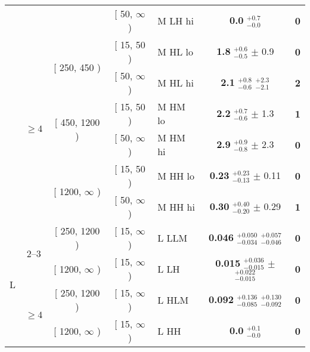 \begin{table}[htbp]
\begin{tabular}{cccclcc}
& & & [ 50, $\infty$ ) & M LH hi & \textbf{0.0} $^{+0.7}_{-0.0}$ & \textbf{0}\\ %

%

& \multirow{6}{*}{$\geq 4$} & \multirow{2}{*}{[ 250, 450 )} & [ 15, 50 ) & M HL lo & \textbf{1.8} $^{+0.6}_{-0.5}$ $\pm$ 0.9 & \textbf{0}\\ %

& & & [ 50, $\infty$ ) & M HL hi & \textbf{2.1} $^{+0.8}_{-0.6}$ $^{+2.3}_{-2.1}$ & \textbf{2}\\ %

& & \multirow{2}{*}{[ 450, 1200 )} & [ 15, 50 ) & M HM lo & \textbf{2.2} $^{+0.7}_{-0.6}$ $\pm$ 1.3 & \textbf{1}\\ %

& & & [ 50, $\infty$ ) & M HM hi & \textbf{2.9} $^{+0.9}_{-0.8}$ $\pm$ 2.3 & \textbf{0}\\ %

& & \multirow{2}{*}{[ 1200, $\infty$ )} & [ 15, 50 ) & M HH lo & \textbf{0.23} $^{+0.23}_{-0.13}$ $\pm$ 0.11 & \textbf{0}\\ %

& & & [ 50, $\infty$ ) & M HH hi & \textbf{0.30} $^{+0.40}_{-0.20}$ $\pm$ 0.29 & \textbf{1}\\ %

\hline

\hline

\multirow{4}{*}{L} 

& \multirow{2}{*}{2--3} & [ 250, 1200 ) & [ 15, $\infty$ ) & L LLM  & \textbf{0.046} $^{+0.050}_{-0.034}$ $^{+0.057}_{-0.046}$ & \textbf{0}\\ %

&  & [ 1200, $\infty$ ) & [ 15, $\infty$ ) & L LH  & \textbf{0.015} $^{+0.036}_{-0.015}$ $\pm$ $^{+0.022}_{-0.015}$ & \textbf{0}\\ %

& \multirow{2}{*}{$\geq 4$} & [ 250, 1200 ) & [ 15, $\infty$ ) & L HLM  & \textbf{0.092} $^{+0.136}_{-0.085}$ $^{+0.130}_{-0.092}$ & \textbf{0}\\ %

&  & [ 1200, $\infty$ ) & [ 15, $\infty$ ) & L HH  & \textbf{0.0} $^{+0.1}_{-0.0}$ & \textbf{0}\\ %


\hline

\end{tabular}

\end{table}



